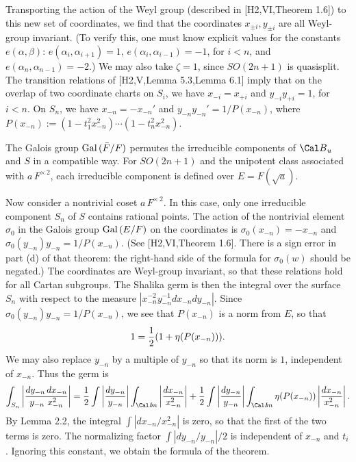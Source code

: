 Transporting the action of the Weyl group (described in
[H2,VI,Theorem 1.6]) to this new set of coordinates, 
we find that the coordinates $x_{\pm i}, y_{\pm i}$ are all
Weyl-group invariant.  (To verify this, one must know explicit
values for the constants $e(\alpha,\beta)$:
$e(\alpha_i,\alpha_{i+1}) = 1$, $e(\alpha_{i},\alpha_{i-1})=
-1$, for $i<n$,  and $e(\alpha_n,\alpha_{n-1}) = -2$.)
We may also take $\zeta=1$, since $SO(2n+1)$ is quasisplit.
The transition relations of
[H2,V,Lemma 5.3,Lemma 6.1] imply that on the overlap of
two coordinate charts on $S_i$, we have
$x_{-i} = x_{+i}$ and $y_{-i} y_{+i}=1$, for $i<n$.
On $S_n$, we have $x_{-n} = -x_{-n}'$ and $y_{-n} y_{-n}' = 1/P(x_{-n})$,
where $P(x_{-n}):= (1-t_1^2 x_{-n}^2)\cdots (1-t_n^2 x_{-n}^2)$.

The
Galois group $\hbox{Gal\,}({\bar F}/F)$ permutes the irreducible
components of ${\Cal B}_u$ and $S$ in a compatible way.  For
$SO(2n+1)$ and the unipotent class associated with $a\,F^{\times\,2}$,
each irreducible component is defined over $E=F(\sqrt{a})$.  

Now consider a nontrivial coset $a\,F^{\times\,2}$.
In this case,
only one
irreducible component $S_n$ of $S$ contains rational points.
The action of the nontrivial element $\sigma_0$ in
the Galois group $\hbox{Gal\,}(E/F)$ on the coordinates
is $\sigma_0(x_{-n}) = -x_{-n}$ and 
$\sigma_0(y_{-n}) y_{-n} = 1/P(x_{-n})$. 
(See [H2,VI,Theorem 1.6].
There is a sign error in part (d) of that theorem:
the right-hand side of the formula for $\sigma_0(w)$
should be negated.)
The coordinates are Weyl-group invariant, so that these
relations hold for all Cartan subgroups.
The Shalika germ is then the integral over the surface $S_n$
with respect to the measure $|x_{-n}^{-2} y_{-n}^{-1} dx_{-n} dy_{-n}|$.
Since $\sigma_0(y_{-n}) y_{-n} = 1/P(x_{-n})$, we see that $P(x_{-n})$
is a norm from $E$, so that
$$1 = {1\over 2} (1 + \eta(P(x_{-n}))).$$
We may also replace $y_{-n}$ by a multiple of $y_{-n}$ so that
its norm is $1$, independent of $x_{-n}$.
Thus the germ is
$$\int_{S_n} \left| {dy_{-n}\, dx_{-n}\over y_{-n}\,\, x_{-n}^2}\right|
= {1\over 2} \int\left | {dy_{-n}\over y_{-n}}\right|
 \int_{\Im}\left | dx_{-n}\over x_{-n}^2 \right| +
 {1\over 2} \int\left | {dy_{-n}\over y_{-n}}\right|
 \int_\Im \eta(P(x_{-n}))\left | dx_{-n}\over x_{-n}^2 \right|.$$
By Lemma 2.2, the integral $\int |dx_{-n}/x_{-n}^2|$ is zero,
so that the first of the two terms is zero.  The normalizing
factor $\int |dy_{-n}/y_{-n}|/2$ is independent
of $x_{-n}$ and $t_i$.  Ignoring this constant,
we obtain the formula of the theorem.

